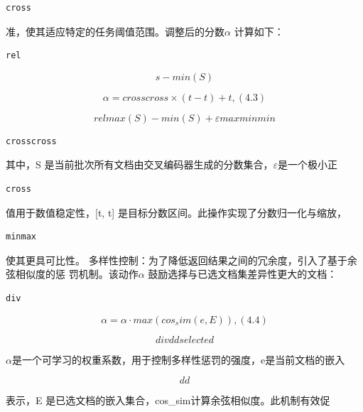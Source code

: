 \documentclass[12pt,a4paper,openright,UTF8]{ctexbook}
\begin{document}
\begin{lstlisting}
cross
\end{lstlisting}
准，使其适应特定的任务阈值范围。调整后的分数$\alpha$ 计算如下：

\begin{lstlisting}
rel
\end{lstlisting}

\begin{equation*}
s −min(S)
\end{equation*}

\begin{equation*}
\alpha =crosscross\times (t −t) + t,(4.3)
\end{equation*}

\begin{equation*}
relmax(S) −min(S) + \varepsilon maxminmin
\end{equation*}

\begin{lstlisting}
crosscross
\end{lstlisting}
其中，S 是当前批次所有文档由交叉编码器生成的分数集合，$\varepsilon$是一个极小正

\begin{lstlisting}
cross
\end{lstlisting}
值用于数值稳定性，[t, t] 是目标分数区间。此操作实现了分数归一化与缩放，

\begin{lstlisting}
minmax
\end{lstlisting}
使其更具可比性。 多样性控制：为了降低返回结果之间的冗余度，引入了基于余弦相似度的惩 罚机制。该动作$\alpha$ 鼓励选择与已选文档集差异性更大的文档：

\begin{lstlisting}
div
\end{lstlisting}

\begin{equation*}
\alpha = \alpha\cdot max (cos _sim(e, E)) ,(4.4)
\end{equation*}

\begin{equation*}
divddselected
\end{equation*}

$\alpha$是一个可学习的权重系数，用于控制多样性惩罚的强度，e是当前文档的嵌入

\begin{equation*}
dd
\end{equation*}

表示，E 是已选文档的嵌入集合，cos\_sim计算余弦相似度。此机制有效促
\end{document}
